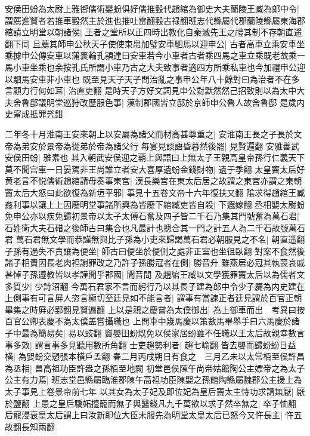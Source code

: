 安侯田蚡為太尉上雅嚮儒術嬰蚡俱好儒推轂代趙綰為御史大夫蘭陵王臧為郎中令|{
	謂薦進賢者若推車轂然主於進也推吐雷翻轂古禄翻班志代縣屬代郡蘭陵縣屬東海郡}
綰請立明堂以朝諸侯|{
	王者之堂所以正四時出教化自秦滅先王之禮其制不存朝直遥翻下同}
且薦其師申公秋天子使使束帛加璧安車駟馬以迎申公|{
	古者高車立乘安車坐乘據申公傳安車以蒲裹輪孔頴達曰安車若今小車者古者乘四馬之車立乘既老故乘一馬小車坐乘也余按孔氏所謂小車乃古之大夫致事者適四方所乘私車也今加禮申公迎以駟馬安車非小車也}
既至見天子天子問治亂之事申公年八十餘對曰為治者不在多言顧力行何如耳|{
	治直吏翻}
是時天子方好文詞見申公對默然然己招致則以為太中大夫舍魯邸議明堂巡狩改歷服色事|{
	漢制郡國皆立邸於京師申公魯人故舍魯邸}
是歲内史甯成抵罪髠鉗

二年冬十月淮南王安來朝上以安屬為諸父而材高甚尊重之|{
	安淮南王長之子長於文帝為弟安於景帝為從弟於帝為諸父行}
每宴見談語昏暮然後罷|{
	見賢遍翻}
安雅善武安侯田蚡|{
	雅素也}
其入朝武安侯迎之覇上與語曰上無太子王親高皇帝孫行仁義天下莫不聞宫車一日晏駕非王尚誰立者安大喜厚遺蚡金錢財物|{
	遺于季翻}
太皇竇太后好黄老言不悦儒術趙綰請毋奏事東宫|{
	漢長樂宫在東太后居之故謂之東宫亦謂之東朝}
竇太后大怒曰此欲復為新垣平邪|{
	事見十五卷文帝十六年復扶又翻}
隂求得趙綰王臧姦利事以讓上上因廢明堂事諸所興為皆廢下綰臧吏皆自殺|{
	下遐嫁翻}
丞相嬰太尉蚡免申公亦以疾免歸初景帝以太子太傅石奮及四子皆二千石乃集其門號奮為萬石君|{
	石姓衛大夫石碏之後師古曰集合也凡最計也摠合其一門之計五人為二千石故號萬石君}
萬石君無文學而恭謹無與比子孫為小吏來歸謁萬石君必朝服見之不名|{
	朝直遥翻}
子孫有過失不責讓為便坐|{
	師古曰便坐於便側之處非正室也坐徂臥翻}
對案不食然後諸子相責因長老肉袒謝罪改之乃許子孫勝冠者在側|{
	勝音升}
雖燕居必冠其執喪哀戚甚悼子孫遵教皆以孝謹聞乎郡國|{
	聞音問}
及趙綰王臧以文學獲罪竇太后以為儒者文多質少|{
	少詩沼翻}
今萬石君家不言而躬行乃以其長子建為郎中令少子慶為内史建在上側事有可言屏人恣言極切至廷見如不能言者|{
	謂事有當諫正者廷見謂於百官正朝畢集之時屛必郢翻見賢遍翻}
上以是親之慶嘗為太僕御出|{
	為上御車而出　考異曰按百官公卿表慶不為太僕盖嘗攝職也}
上問車中幾馬慶以策數馬畢舉手曰六馬慶於諸子中最為簡易矣|{
	易以豉翻}
竇嬰田蚡既免以侯家居蚡雖不任職以王太后故親幸數言事多效|{
	謂言事多見聽用數所角翻}
士吏趨勢利者|{
	趨七喻翻}
皆去嬰而歸蚡蚡日益横|{
	為嬰蚡交愬張本横戶孟翻}
春二月丙戌朔日有食之　三月乙未以太常栢至侯許昌為丞相|{
	昌高祖功臣許盎之孫栢至地闕}
初堂邑侯陳午尚帝姑館陶公主嫖帝之為太子公主有力焉|{
	班志堂邑縣屬臨淮郡陳午高祖功臣陳嬰之孫館陶縣屬魏郡公主援上為太子事見上卷景帝前七年}
以其女為太子妃及即位妃為皇后竇太主恃功求請無厭|{
	厭於鹽翻}
上患之皇后驕妬擅寵而無子與醫錢凡九千萬欲以求子然卒無之|{
	卒子恤翻}
后寵浸衰皇太后謂上曰汝新即位大臣未服先為明堂太皇太后已怒今又忤長主|{
	忤五故翻長知兩翻}
